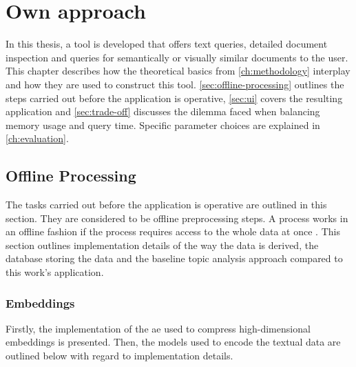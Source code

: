 \chapter{Own approach}\label{ch:implementation}

In this thesis, a tool is developed that offers text queries, detailed document inspection and queries for semantically or visually similar documents to the user.
This chapter describes how the theoretical basics from \autoref{ch:methodology} interplay and how they are used to construct this tool.
\autoref{sec:offline-processing} outlines the steps carried out before the application is operative, 
\autoref{sec:ui} covers the resulting application and 
\autoref{sec:trade-off} discusses the dilemma faced when balancing memory usage and query time. 
Specific parameter choices are explained in \autoref{ch:evaluation}.


\section{Offline Processing}\label{sec:offline-processing}

The tasks carried out before the application is operative are outlined in this section.
They are considered to be offline preprocessing steps.  
A process works in an offline fashion if the process requires access to the whole data at once \cite{offline2022}.
This section outlines implementation details of the way the data is derived, 
the database storing the data and the baseline topic analysis approach compared to this work's application.





\subsection{Embeddings}\label{subsec:impl-embeddings}

Firstly, the implementation of the \ac{ae} used to compress high-dimensional embeddings is presented.
Then, the models used to encode the textual data are outlined below with regard to implementation details.







